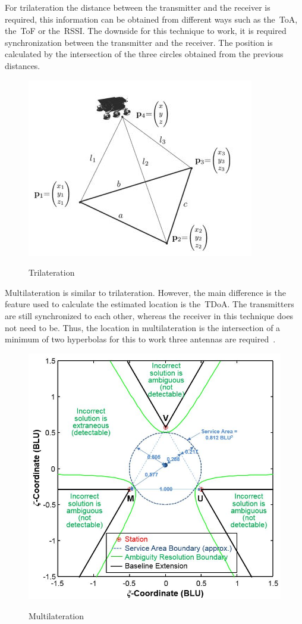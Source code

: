 For trilateration the distance between the transmitter and the receiver is required, this information can be obtained from different ways such as the~\gls{ToA}, the~\gls{ToF} or the~\gls{RSSI}. The downside  for this technique to work, it is required synchronization between the transmitter and the receiver. The position is calculated by the intersection of the three circles obtained from the previous distances.\newline\newline\newline


\begin{figure}[htbp]
  \centering
  
    {\includegraphics[width=0.5\linewidth]{Chapters/Figures/trilateracao.JPG}}%
 
  \caption{Trilateration~\cite{Thomas2005}}
  \label{fig:Trilateration}
\end{figure}


Multilateration is  similar to trilateration. However, the main difference is the feature used to calculate the estimated location is the~\gls{TDoA}. The transmitters are still synchronized to each other, whereas the receiver in this technique does not need to be. Thus, the location in multilateration is the intersection of a minimum of two hyperbolas for this to work three antennas are required~\cite{Fargas2017RL1}.

\begin{figure}[htbp]
  \centering
  
    {\includegraphics[width=0.5\linewidth]{Chapters/Figures/Multilateration.jpg}}%
 
  \caption{Multilateration~\cite{multilateration}}
  \label{fig:Multilateration}
\end{figure}


